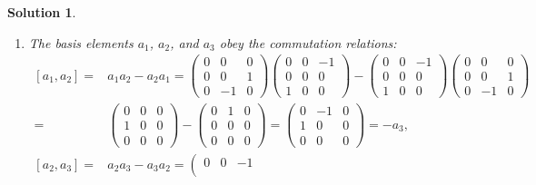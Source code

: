 \documentclass[UTF8,10pt,a4paper]{article}
\theoremstyle{Problem}
\theoremstyle{Solution}
\newtheorem*{sol}{Solution}
\begin{document}
\begin{sol}
    \begin{enumerate}
        \item[(a)] The basis elements $a_1$, $a_2$, and $a_3$ obey the commutation relations:
        \begin{align}
            \nonumber[a_1,a_2]=&a_1a_2-a_2a_1=\left(\begin{matrix}
                0&0&0\\
                0&0&1\\
                0&-1&0
            \end{matrix}\right)\left(\begin{matrix}
                0&0&-1\\
                0&0&0\\
                1&0&0
            \end{matrix}\right)-\left(\begin{matrix}
                0&0&-1\\
                0&0&0\\
                1&0&0
            \end{matrix}\right)\left(\begin{matrix}
                0&0&0\\
                0&0&1\\
                0&-1&0
            \end{matrix}\right)\\
            =&\left(\begin{matrix}
                0&0&0\\
                1&0&0\\
                0&0&0
            \end{matrix}\right)-\left(\begin{matrix}
                0&1&0\\
                0&0&0\\
                0&0&0
            \end{matrix}\right)=\left(\begin{matrix}
                0&-1&0\\
                1&0&0\\
                0&0&0
            \end{matrix}\right)=-a_3,\\
            \nonumber[a_2,a_3]=&a_2a_3-a_3a_2=\left(\begin{matrix}
                0&0&-1\\

\end{matrix}
\end{align}
\end{enumerate}
\end{sol}
\end{document}
